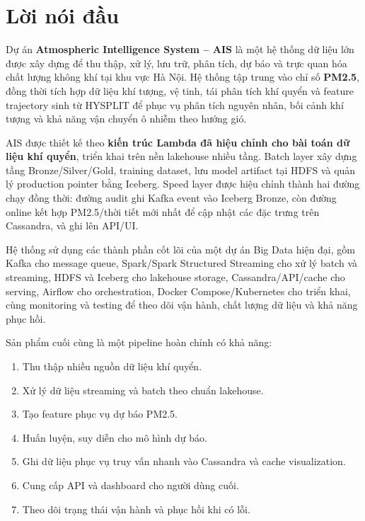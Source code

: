 \documentclass[12pt,a4paper]{article}
\newcommand{\tightlist}{\setlength{\itemsep}{0pt}\setlength{\parskip}{0pt}}
\begin{document}
\newpage
\begingroup
\normalsize
{}
\setlength{\parskip}{0pt}
\tableofcontents
\endgroup
\newpage

\section{Lời nói đầu}\label{lux1eddi-nuxf3i-ux111ux1ea7u}

Dự án \textbf{Atmospheric Intelligence System -- AIS} là một hệ thống dữ liệu lớn được xây dựng để thu thập, xử lý, lưu trữ, phân tích, dự báo và trực quan hóa chất lượng không khí tại khu vực Hà Nội. Hệ thống tập trung vào chỉ số \textbf{PM2.5}, đồng thời tích hợp dữ liệu khí tượng, vệ tinh, tái phân tích khí quyển và feature trajectory sinh từ HYSPLIT để phục vụ phân tích nguyên nhân, bối cảnh khí tượng và khả năng vận chuyển ô nhiễm theo hướng gió.

AIS được thiết kế theo \textbf{kiến trúc Lambda đã hiệu chỉnh cho bài toán dữ liệu khí quyển}, triển khai trên nền lakehouse nhiều tầng. Batch layer xây dựng tầng Bronze/Silver/Gold, training dataset, lưu model artifact tại HDFS và quản lý production pointer bằng Iceberg. Speed layer được hiệu chỉnh thành hai đường chạy đồng thời: đường audit ghi Kafka event vào Iceberg Bronze, còn đường online kết hợp PM2.5/thời tiết mới nhất để cập nhật các đặc trưng trên Cassandra, và ghi lên API/UI.

Hệ thống sử dụng các thành phần cốt lõi của một dự án Big Data hiện đại, gồm Kafka cho message queue, Spark/Spark Structured Streaming cho xử lý batch và streaming, HDFS và Iceberg cho lakehouse storage, Cassandra/API/cache cho serving, Airflow cho orchestration, Docker Compose/Kubernetes cho triển khai, cùng monitoring và testing để theo dõi vận hành, chất lượng dữ liệu và khả năng phục hồi.

Sản phẩm cuối cùng là một pipeline hoàn chỉnh có khả năng:

\begin{enumerate}
\def\labelenumi{\arabic{enumi}.}
\tightlist
\item
  Thu thập nhiều nguồn dữ liệu khí quyển.
\item
  Xử lý dữ liệu streaming và batch theo chuẩn lakehouse.
\item
  Tạo feature phục vụ dự báo PM2.5.
\item
  Huấn luyện, suy diễn cho mô hình dự báo.
\item
  Ghi dữ liệu phục vụ truy vấn nhanh vào Cassandra và cache visualization.
\item
  Cung cấp API và dashboard cho người dùng cuối.
\item
  Theo dõi trạng thái vận hành và phục hồi khi có lỗi.
\end{enumerate}
\end{document}
